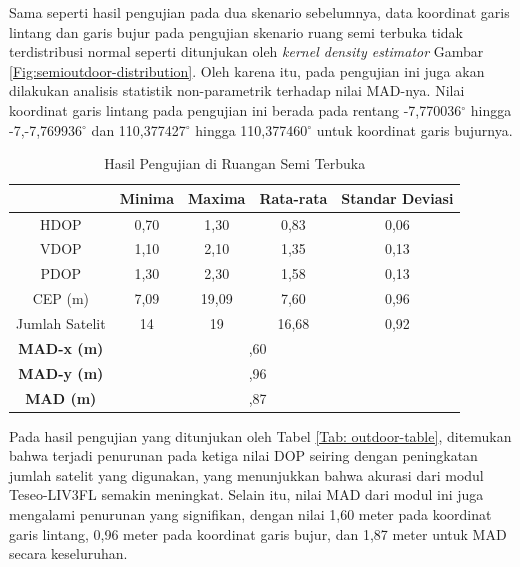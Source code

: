 Sama seperti hasil pengujian pada dua skenario sebelumnya, data koordinat garis lintang dan garis bujur pada pengujian skenario ruang semi terbuka tidak terdistribusi normal seperti ditunjukan oleh \textit{kernel density estimator} Gambar \ref{Fig:semioutdoor-distribution}. Oleh karena itu, pada pengujian ini juga akan dilakukan analisis statistik non-parametrik terhadap nilai MAD-nya. Nilai koordinat garis lintang pada pengujian ini berada pada rentang -7,770036$^{\circ}$ hingga -7,-7,769936$^{\circ}$ dan 110,377427$^{\circ}$ hingga 110,377460$^{\circ}$ untuk koordinat garis bujurnya.

\begin{table}[H]
	\caption{Hasil Pengujian di Ruangan Semi Terbuka}
	\vspace{0.5em}
	\centering
	\begin{tabular}{ccccc}
		\hline
		& \textbf{Minima} & \textbf{Maxima} & \textbf{Rata-rata} & \textbf{Standar Deviasi}\\
		\hline 
		HDOP & 0,70 & 1,30 & 0,83 & 0,06\\
		VDOP & 1,10	& 2,10 & 1,35 & 0,13\\
		PDOP & 1,30	& 2,30 & 1,58 & 0,13\\
		CEP (m) & 7,09	& 19,09 & 7,60 & 0,96\\
		Jumlah Satelit & 14 & 19 & 16,68 & 0,92\\
		\hline
		\textbf{MAD-x (m)} & & \multicolumn{2}{c}{\centering 1,60} & \\
		\hline
		\textbf{MAD-y (m)} & & \multicolumn{2}{c}{\centering 0,96} & \\
		\hline
		\textbf{MAD (m)} & & \multicolumn{2}{c}{\centering 1,87} & \\
		\hline
	\end{tabular}
	\label{Tab: semioutdoor-table}
\end{table}

Pada hasil pengujian yang ditunjukan oleh Tabel \ref{Tab: outdoor-table}, ditemukan bahwa terjadi penurunan pada ketiga nilai DOP seiring dengan peningkatan jumlah satelit yang digunakan, yang menunjukkan bahwa akurasi dari modul Teseo-LIV3FL semakin meningkat. Selain itu, nilai MAD dari modul ini juga mengalami penurunan yang signifikan, dengan nilai 1,60 meter pada koordinat garis lintang, 0,96 meter pada koordinat garis bujur, dan 1,87 meter untuk MAD secara keseluruhan.

